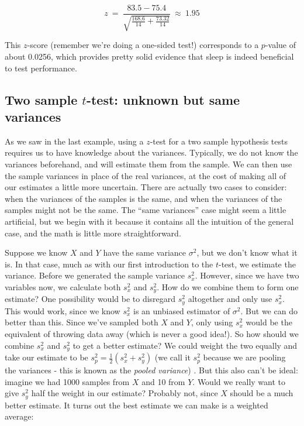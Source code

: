 \begin{equation*}

z\ = \ \frac{83.5-75.4}{\sqrt{\frac{168.6}{14}+\frac{73.32}{14}}}\ \approx \ 1.95

\end{equation*}

This $z$-score (remember we're doing a one-sided test!) corresponds to a $p$-value of about 0.0256, which provides pretty solid evidence that sleep is indeed beneficial to test performance.







\subsection{Two sample $t$-test: unknown but same variances}



As we saw in the last example, using a $z$-test for a two sample hypothesis tests requires us to have knowledge about the variances.  Typically, we do not know the variances beforehand, and will estimate them from the sample.  We can then use the sample variances in place of the real variances, at the cost of making all of our estimates a little more uncertain.  There are actually two cases to consider: when the variances of the samples is the same, and when the variances of the samples might not be the same.  The ``same variances'' case might seem a little artificial, but we begin with it because it contains all the intuition of the general case, and the math is little more straightforward.



Suppose we know $X$ and $Y$ have the same variance $\sigma^2$, but we don't know what it is.  In that case,  much as with our first introduction to the $t$-test, we estimate the variance.  Before we generated the sample variance $s^2_x$.  However, since we have two variables now, we calculate both $s^2_x$ and $s^2_y$.  How do we combine them to form one estimate?  One possibility would be to disregard $s^2_y$ altogether and only use $s^2_x$.  This would work, since we know $s^2_x$ is an unbiased estimator of $\sigma^2$.  But we can do better than this.  Since we've sampled both $X$ and $Y$, only using $s^2_x$ would be the equivalent of throwing data away (which is never a good idea!).  So how should we combine $s^2_x$ and $s^2_y$ to get a better estimate?  We could weight the two equally and take our estimate to be $s^2_p = \frac{1}{2}\left(s^2_x + s^2_y\right)$ (we call it $s^2_p$ because we are pooling the variances - this is known as the \emph{pooled variance}) .  But this also can't be ideal: imagine we had 1000 samples from $X$ and 10 from $Y$.  Would we really want to give $s^2_y$ half the weight in our estimate? Probably not, since $X$ should be a much better estimate.  It turns out the best estimate we can make is a weighted average:



